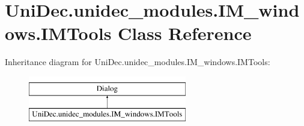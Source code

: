 \hypertarget{class_uni_dec_1_1unidec__modules_1_1_i_m__windows_1_1_i_m_tools}{}\section{Uni\+Dec.\+unidec\+\_\+modules.\+I\+M\+\_\+windows.\+I\+M\+Tools Class Reference}
\label{class_uni_dec_1_1unidec__modules_1_1_i_m__windows_1_1_i_m_tools}
Inheritance diagram for Uni\+Dec.\+unidec\+\_\+modules.\+I\+M\+\_\+windows.\+I\+M\+Tools\+:\begin{figure}[H]
\begin{center}
\leavevmode
\includegraphics[height=2.000000cm]{class_uni_dec_1_1unidec__modules_1_1_i_m__windows_1_1_i_m_tools}
\end{center}
\end{figure}
